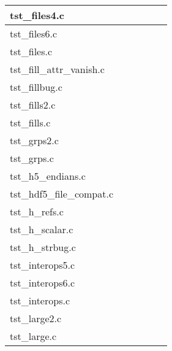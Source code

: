 \begin{table}[H]
\begin{tabular}{|l|c|c|c|c|c|}
tst\_files4.c   &   &   &   &   &   \\ \hline
tst\_files6.c   &   &   &   &   &   \\ \hline
tst\_files.c   &   &   &   &   &   \\ \hline
tst\_fill\_attr\_vanish.c   &   &   &   &   &   \\ \hline
tst\_fillbug.c   &   &   &   &   &   \\ \hline
tst\_fills2.c   &   &   &   &   &   \\ \hline
tst\_fills.c   &   &   &   &   &   \\ \hline
tst\_grps2.c   &   &   &   &   &   \\ \hline
tst\_grps.c   &   &   &   &   &   \\ \hline
tst\_h5\_endians.c   &   &   &   &   &   \\ \hline
tst\_hdf5\_file\_compat.c   &   &   &   &   &   \\ \hline
tst\_h\_refs.c   &   &   &   &   &   \\ \hline
tst\_h\_scalar.c   &   &   &   &   &   \\ \hline
tst\_h\_strbug.c   &   &   &   &   &   \\ \hline
tst\_interops5.c   &   &   &   &   &   \\ \hline
tst\_interops6.c   &   &   &   &   &   \\ \hline
tst\_interops.c   &   &   &   &   &   \\ \hline
tst\_large2.c   &   &   &   &   &   \\ \hline
tst\_large.c   &   &   &   &   &   \\ \hline
\hline
\end{tabular}
\caption{}
\end{table}

\clearpage

